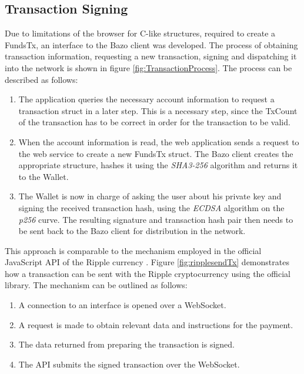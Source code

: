 \subsection{Transaction Signing}\label{transactionsigning}
Due to limitations of the browser for C-like structures, required to create a FundsTx, an interface to the Bazo client was developed.
The process of obtaining transaction information, requesting a new transaction, signing and dispatching it into the network is shown in figure \ref{fig:TransactionProcess}. The process can be described as follows:
\begin{enumerate}
\item The application queries the necessary account information to request a transaction struct in a later step. This is a necessary step, since the TxCount of the transaction has to be correct in order for the transaction to be valid.
\item When the account information is read, the web application sends a request to the web service to create a new FundsTx struct. The Bazo client creates the appropriate structure, hashes it using the \textit{SHA3-256} algorithm and returns it to the Wallet.
\item The Wallet is now in charge of asking the user about his private key and signing the received transaction hash, using the \textit{ECDSA} algorithm on the \textit{p256} curve. The resulting signature and transaction hash pair then needs to be sent back to the Bazo client for distribution in the network.
\end{enumerate}

This approach is comparable to the mechanism employed in the official JavaScript API of the Ripple currency \cite{ripplelib}.
Figure \ref{fig:ripplesendTx} demonstrates how a transaction can be sent with the Ripple cryptocurrency using the official library. The mechanism can be outlined as follows:
\begin{enumerate}
\item A connection to an interface is opened over a WebSocket.
\item A request is made to obtain relevant data and instructions for the payment.
\item The data returned from preparing the transaction is signed.
\item The API submits the signed transaction over the WebSocket.
\end{enumerate}


